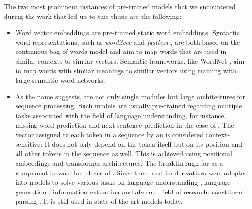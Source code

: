 \documentclass[../document.tex]{subfiles}
\begin{document}
    The two most prominent instances of pre-trained models that we encountered during the work that led up to this thesis are the following:
    \begin{itemize}
        \item
            Word vector embeddings are pre-trained static word embeddings.
            Syntactic word representations, such as \emph{word2vec} \citep{word2vec} and \emph{fasttext} \citep{fasttext}, are both based on the continuous bag of words model and aim to map words that are used in similar contexts to similar vectors.
            Semantic frameworks, like WordNet \citep{wordnet}, aim to map words with similar meanings to similar vectors using training with large semantic word networks.
        \item
            As the name suggests,   are not only single modules but large architectures for sequence processing.
            Such models are usually pre-trained regarding multiple tasks associated with the field of language understanding, for instance, missing word prediction and next sentence prediction in the case of .
            The vector assigned to each token in a sequence by an  is considered context-sensitive:
                It does not only depend on the token itself but on its position and all other tokens in the sequence as well.
                This is achieved using positional embeddings and transformer architectures.
            The breakthrough for  as a component in  was the release of  \citep{Devlin2019}.
            Since then,  and its derivatives were adopted into models to solve various tasks on language understanding \citep[they experiment with models for question answering, entailment recognition, sentiment analysis, i.a.]{Devlin2019, roberta}, language generation \citep[they experiment with models for summarization, translation, i.a.]{bertgeneration}, information extraction \citep[they experiment with models for named entity recognition, relation extraction]{biobert} and also our field of research: constituent parsing \citep{Cor20, FerGom20a, FerGom22,Coa21, Sun22}.
            It is still used in state-of-the-art models today.
    \end{itemize}

    \ifSubfilesClassLoaded{%
        \printindex
    }{}
\end{document}
